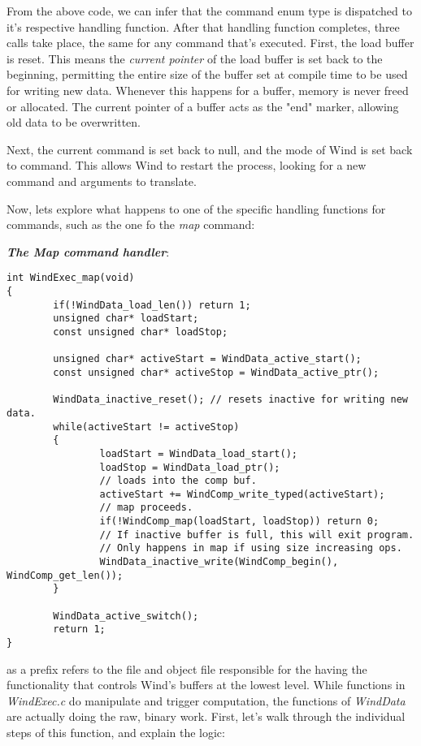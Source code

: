 \par From the above code, we can infer that the command enum type is dispatched to it's respective handling function. After that handling function completes, three calls take place, the same for any command that's executed. First, the load buffer is reset. This means the \emph{current pointer} of the load buffer is set back to the beginning, permitting the entire size of the buffer set at compile time to be used for writing new data. Whenever this happens for a buffer, memory is never freed or allocated. The current pointer of a buffer acts as the "end" marker, allowing old data to be overwritten.
\par Next, the current command is set back to null, and the mode of Wind is set back to command. This allows Wind to restart the process, looking for a new command and arguments to translate.

\par Now, lets explore what happens to one of the specific handling functions for commands, such as the one fo the \emph{map} command:

\textbf{\emph{The Map command handler}}:

\begin{lstlisting}[style=numc]
int WindExec_map(void)
{
        if(!WindData_load_len()) return 1;
        unsigned char* loadStart;
        const unsigned char* loadStop;

        unsigned char* activeStart = WindData_active_start();
        const unsigned char* activeStop = WindData_active_ptr();

        WindData_inactive_reset(); // resets inactive for writing new data.
        while(activeStart != activeStop)
        {
                loadStart = WindData_load_start();
                loadStop = WindData_load_ptr();
                // loads into the comp buf.
                activeStart += WindComp_write_typed(activeStart);
                // map proceeds.
                if(!WindComp_map(loadStart, loadStop)) return 0;
                // If inactive buffer is full, this will exit program.
                // Only happens in map if using size increasing ops.
                WindData_inactive_write(WindComp_begin(), WindComp_get_len());
        }

        WindData_active_switch();
        return 1;
}
\end{lstlisting}

\par {} as a prefix refers to the file and object file responsible for the having the functionality that controls Wind's buffers at the lowest level. While functions in \emph{WindExec.c} do manipulate and trigger computation, the functions of \emph{WindData} are actually doing the raw, binary work. First, let's walk through the individual steps of this function, and explain the logic: \\

